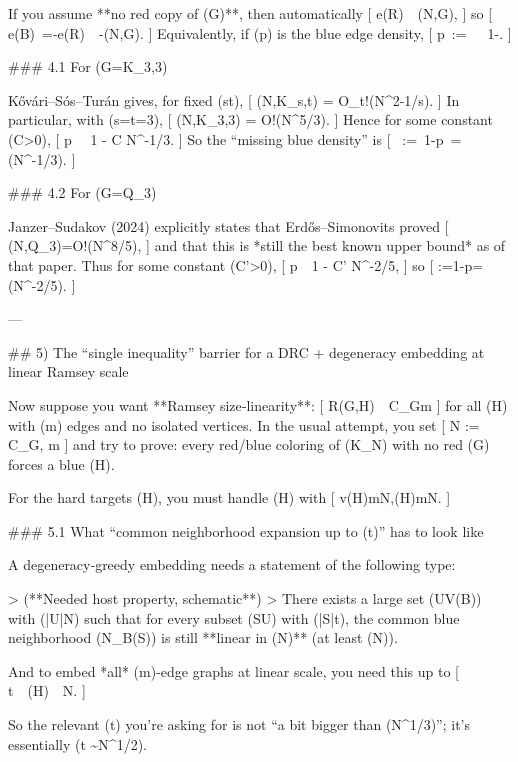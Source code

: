 If you assume **no red copy of (G)**, then automatically
[
e(R)\ \le\ (N,G),
]
so
[
e(B)\ =-e(R)\ \ge\ -(N,G).
]
Equivalently, if (p) is the blue edge density,
[
p\ :=\ \ \ge\ 1-.
]

### 4.1 For (G=K_{3,3})

Kővári–Sós–Turán gives, for fixed (s\le t),
[
(N,K_{s,t}) = O_t!\left(N^{2-1/s}\right).
]
In particular, with (s=t=3),
[
(N,K_{3,3}) = O!\left(N^{5/3}\right).
]
Hence for some constant (C>0),
[
p \ \ge\ 1 - C N^{-1/3}.
]
So the “missing blue density” is
[
\varepsilon\ :=\ 1-p\ =\Theta(N^{-1/3})\quad{}.
]

### 4.2 For (G=Q_3)

Janzer–Sudakov (2024) explicitly states that Erdős–Simonovits proved
[
(N,Q_3)=O!\left(N^{8/5}\right),
]
and that this is *still the best known upper bound* as of that paper.
Thus for some constant (C'>0),
[
p\ \ge\ 1 - C' N^{-2/5},
]
so
[
\varepsilon:=1-p=\Theta(N^{-2/5}).
]

---

## 5) The “single inequality” barrier for a DRC + degeneracy embedding at linear Ramsey scale

Now suppose you want **Ramsey size‑linearity**:
[
R(G,H)\ \le\ C_G\cdot m
]
for all (H) with (m) edges and no isolated vertices. In the usual attempt, you set
[
N := C_G, m
]
and try to prove: every red/blue coloring of (K_N) with no red (G) forces a blue (H).

For the hard targets (H), you must handle (H) with
[
v(H)\asymp m\asymp N,\qquad {}(H)\asymp \sqrt m\asymp \sqrt N.
]

### 5.1 What “common neighborhood expansion up to (t)” has to look like

A degeneracy‑greedy embedding needs a statement of the following type:

> (**Needed host property, schematic**)
> There exists a large set (U\subseteq V(B)) with (|U|\asymp N) such that for every subset (S\subseteq U) with (|S|\le t), the common blue neighborhood (N_B(S)) is still **linear in (N)** (at least (\asymp N)).

And to embed *all* (m)-edge graphs at linear scale, you need this up to
[
t\ \gtrsim\ (H)\ \asymp\ \sqrt N.
]

So the relevant (t) you’re asking for is not “a bit bigger than (N^{1/3})”; it’s essentially (t \sim N^{1/2}).

